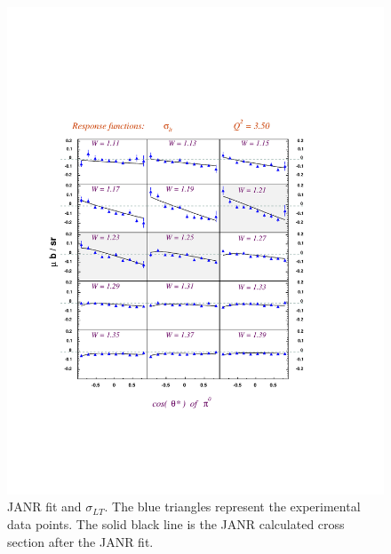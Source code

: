 \begin{figure}[h]
 \includegraphics[width = 13cm, bb=-30 140 480 640]{analysis/img/slt_Q23.50_Inn_L1}
  \caption[JANR fit of the cross section: $\sigma_T+\epsilon_L\sigma_L$]
{ JANR fit and  $\sigma_{LT}$. The blue triangles represent the experimental data points. The solid black line
 is the JANR calculated cross section after the JANR fit.}
 \label{fig:lt_Q23.50_Inn_L1}
\end{figure}

